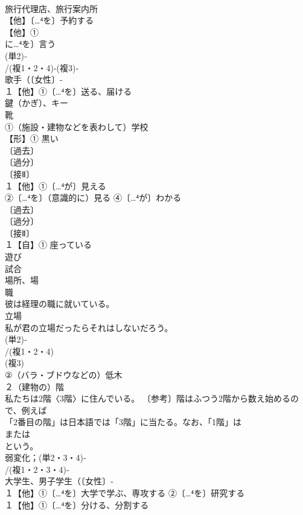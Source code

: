\documentclass[8pt]{extreport}
\begin{document}
\begin{CJK}{UTF8}{min}
\\	旅行代理店、旅行案内所
\\	【他】〔…⁴を〕予約する 
\\	【他】①
\\	に…⁴を〕言う
\\	(単2)‐
\\	/(複1・2・4)‐(複3)‐
\\	歌手（〔女性〕-
\\	１【他】①〔…⁴を〕送る、届ける
\\	鍵（かぎ）、キー
\\	靴
\\	①（施設・建物などを表わして）学校
\\	【形】① 黒い
\\	〔過去〕
\\	〔過分〕
\\	〔接Ⅱ〕
\\	１【他】①〔…⁴が〕見える
\\	②〔…⁴を〕（意識的に）見る ④〔…⁴が〕わかる
\\	〔過去〕
\\	〔過分〕
\\	〔接Ⅱ〕
\\	１【自】① 座っている
\\	遊び 
\\	試合
\\	場所、場 
\\	職 
\\	彼は経理の職に就いている。 
\\	立場 
\\	私が君の立場だったらそれはしないだろう。
\\	(単2)‐
\\	/(複1・2・4)
\\	(複3)
\\	②（バラ・ブドウなどの）低木 
\\	２（建物の）階
\\	私たちは2階〈3階〉に住んでいる。 〔参考〕階はふつう2階から数え始めるので、例えば
\\	「2番目の階」は日本語では「3階」に当たる。なお、「1階」は
\\	または
\\	という。
\\	弱変化；(単2・3・4)‐
\\	/(複1・2・3・4)‐
\\	大学生、男子学生（〔女性〕‐
\\	１【他】①〔…⁴を〕大学で学ぶ、専攻する ②〔…⁴を〕研究する
\\	１【他】①〔…⁴を〕分ける、分割する

\end{CJK}
\end{document}
